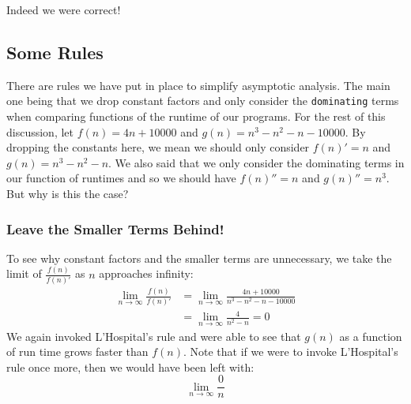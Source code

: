 \documentclass{article}
\begin{document}
\begin{center}
\end{center}
Indeed we were correct!
\subsection{Some Rules}
There are rules we have put in place to simplify asymptotic analysis. The main one being that we drop constant factors and only consider the \texttt{dominating} terms when comparing functions of the runtime of our programs. For the rest of this discussion, let $f(n) = 4n + 10000$ and $g(n) = n^3 - n^2 - n - 10000$. By dropping the constants here, we mean we should only consider $f(n)' = n$ and $g(n) = n^3 - n^2 - n$. We also said that we only consider the dominating terms in our function of runtimes and so we should have $f(n)'' = n$ and $g(n)'' = n^3$. But why is this the case?
\subsubsection{Leave the Smaller Terms Behind!}
To see why constant factors and the smaller terms are unnecessary, we take the limit of $\frac{f(n)}{f(n)'}$ as $n$ approaches infinity:
\begin{align}
    \lim_{n\to\infty} \frac{f(n)}{f(n)'} &= \lim_{n\to\infty} \frac{4n + 10000}{n^3 - n^2 - n - 10000} \\
                                            &= \lim_{n\to\infty} \frac{4}{n^2 - n} = 0
\end{align}
We again invoked L'Hospital's rule and were able to see that $g(n)$ as a function of run time grows faster than $f(n)$. Note that if we were to invoke L'Hospital's rule once more, then we would have been left with:
        $$\lim_{n\to\infty} \frac{0}{n}$$

\newpage
\end{document}
